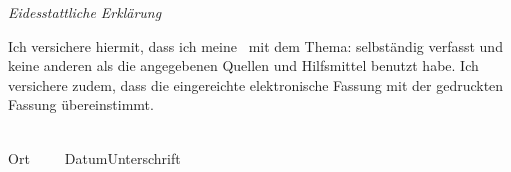 

\newpage
\thispagestyle{empty}
\begin{center}
\Huge\emph{Eidesstattliche Erklärung}
\end{center}
\medskip
\noindent
Ich versichere hiermit, dass ich meine \Titel\ mit
dem Thema: \glqq \Was \grqq{ }selbständig verfasst und keine anderen als die angegebenen Quellen und Hilfsmittel benutzt habe. Ich versichere zudem, dass die eingereichte elektronische Fassung mit der gedruckten Fassung übereinstimmt.

\vspace{3cm}
\noindent
\underline{\hspace{4cm}}\hfill\underline{\hspace{6cm}}\\
Ort~~~~~Datum\hfill Unterschrift\hspace{4cm}

\vfill

\endinput
